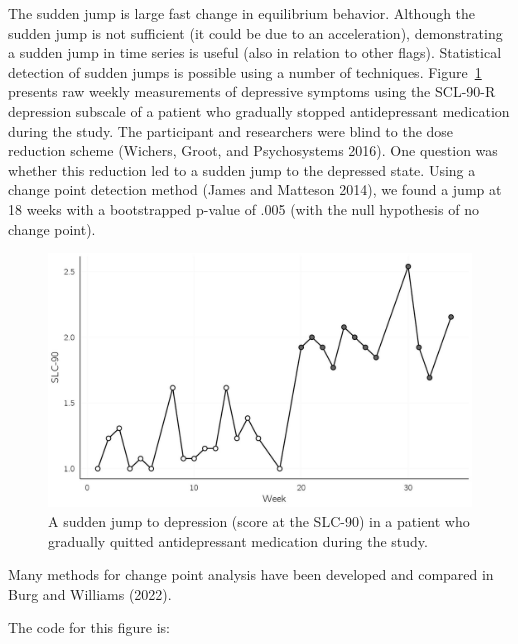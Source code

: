 \documentclass[
  a4paper,
  DIV=11,
  numbers=noendperiod,
  oneside]{scrreprt}
\begin{document}
The sudden jump is large fast change in equilibrium behavior. Although
the sudden jump is not sufficient (it could be due to an acceleration),
demonstrating a sudden jump in time series is useful (also in relation
to other flags). Statistical detection of sudden jumps is possible using
a number of techniques. Figure~\ref{fig-ch3-img19-old-31} presents raw
weekly measurements of depressive symptoms using the SCL-90-R depression
subscale of a patient who gradually stopped antidepressant medication
during the study. The participant and researchers were blind to the dose
reduction scheme (Wichers, Groot, and Psychosystems 2016). One question
was whether this reduction led to a sudden jump to the depressed state.
Using a change point detection method (James and Matteson 2014), we
found a jump at 18 weeks with a bootstrapped p-value of .005 (with the
null hypothesis of no change point).

\begin{figure}

{\centering \includegraphics{media/ch3/fig-ch3-img19-old-31.jpg}

}

\caption{\label{fig-ch3-img19-old-31}A sudden jump to depression (score
at the SLC-90) in a patient who gradually quitted antidepressant
medication during the study.}

\end{figure}

Many methods for change point analysis have been developed and compared
in Burg and Williams (2022).

The code for this figure is:
\end{document}

